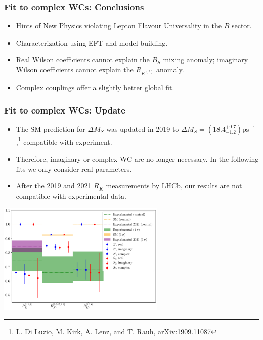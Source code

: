 \documentclass[mathserif, 10pt]{beamer}
\begin{document}
\begin{frame}\frametitle{Fit to complex WCs: Conclusions}
    \begin{itemize}
        \item Hints of New Physics violating Lepton Flavour Universality in the $B$ sector.
        \item Characterization using EFT and model building.
        \item Real Wilson coefficients cannot explain the $B_S$ mixing anomaly; imaginary Wilson coefficients cannot explain the $R_{K^{(*)}}$ anomaly.
        \item Complex couplings offer a slightly better global fit.

    \end{itemize}

\end{frame}

\begin{frame}\frametitle{Fit to complex WCs: Update}
    \begin{itemize}
        \item The SM prediction for $\Delta M_S$ was updated in 2019 to $\Delta M_S = (18.4^{+0.7}_{-1.2}) \mathrm{ps}^{-1}$,\footnote[9]{L. Di Luzio, M. Kirk, A. Lenz, and T. Rauh, arXiv:1909.11087} compatible with experiment.
        \item Therefore, imaginary or complex WC are no longer necessary. In the following fits we only consider real parameters.
        \item After the 2019 and 2021 $R_K$ measurements by LHCb, our results are not compatible with experimental data.
    \end{itemize}

    \begin{center}
        \includegraphics[width=0.6\textwidth]{figures/errorplot_RK2021.pdf}
    \end{center}

\end{frame}
\end{document}
